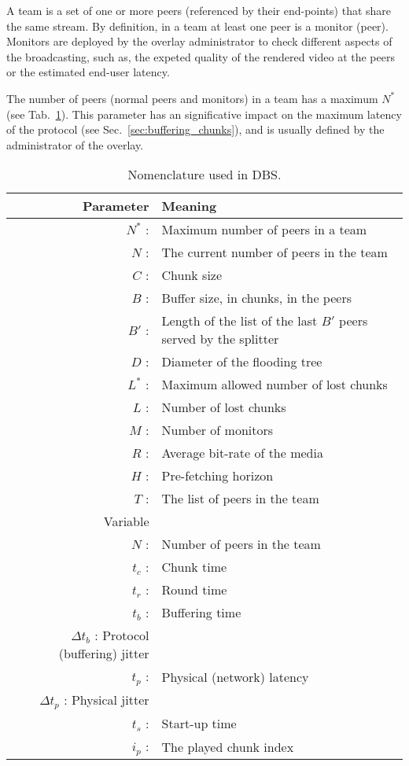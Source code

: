 

\label{sec:team_def}

A team is a set of one or more peers (referenced by their end-points)
that share the same stream. By definition, in a team at least one peer
is a \gls{monitor} (peer). Monitors are deployed by the overlay
administrator to check different aspects of the broadcasting, such as,
the expeted quality of the rendered video at the peers or the
estimated end-user latency.

The number of peers (normal peers and monitors) in a team has a
maximum $N^*$ (see Tab.~\ref{tab:DBS_nomenclature}). This parameter
has an significative impact on the maximum latency of the protocol (see
Sec.~\ref{sec:buffering_chunks}), and is usually defined by the
administrator of the overlay.

\begin{table}[t]
  \centering
  \begin{tabular}{rl}
    Parameter & Meaning \\
    \hline
    $N^*$ :  & Maximum number of peers in a team \\
    $N$ :    & The current number of peers in the team \\
    $C$ :    & Chunk size \\
    $B$ :    & Buffer size, in chunks, in the peers \\
    $B'$ :   & Length of the list of the last $B'$ peers served by the splitter \\ 
    $D$ :    & Diameter of the flooding tree \\
    $L^*$ :  & Maximum allowed number of lost chunks \\
    $L$ :    & Number of lost chunks \\
    $M$ :    & Number of monitors \\
    $R$ :    & Average bit-rate of the media \\
    $H$ :    & Pre-fetching horizon \\
    $T$ :    & The list of peers in the team \\
    Variable & \\
    \hline
    $N$ :    & Number of peers in the team \\
    $t_c$ :  & Chunk time \\
    $t_r$ :  & Round time \\
    $t_b$ :  & Buffering time \\
    $\Delta t_b$ : Protocol (buffering) jitter \\ 
    $t_p$ :  & Physical (network) latency \\
    $\Delta t_p$ : Physical jitter \\
    $t_s$ :  & Start-up time \\
    $i_p$ :  & The played chunk index 
  \end{tabular}
  \caption{Nomenclature used in DBS.} %
  \label{tab:DBS_nomenclature}
\end{table}

